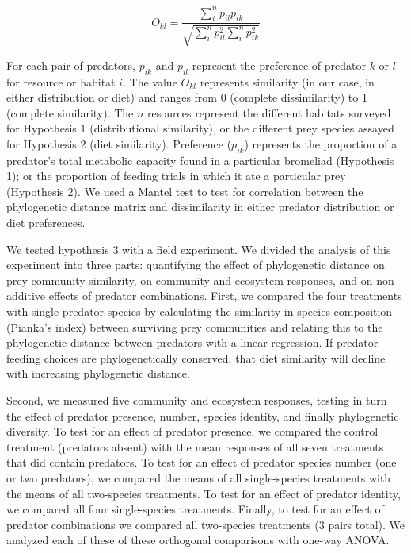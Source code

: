 \documentclass[11pt]{article}
\begin{document}
\begin{equation}
{ O_{kl}=\dfrac{\sum_i^n{p_{il} p_{ik}}}{\sqrt{\sum_i^n{p_{il}^2} \sum_i^n{p_{ik}^2}}} }
\end{equation}

For each pair of predators, \(p_{ik}\) and \(p_{il}\) represent the
preference of predator \(k\) or \(l\) for resource or habitat \(i\). The
value \(O_{kl}\) represents similarity (in our case, in either
distribution or diet) and ranges from 0 (complete dissimilarity) to 1
(complete similarity). The \(n\) resources represent the different
habitats surveyed for Hypothesis 1 (distributional similarity), or the
different prey species assayed for Hypothesis 2 (diet similarity).
Preference (\(p_{ik}\)) represents the proportion of a predator's total
metabolic capacity found in a particular bromeliad (Hypothesis 1); or
the proportion of feeding trials in which it ate a particular prey
(Hypothesis 2). We used a Mantel test to test for correlation between the phylogenetic distance matrix
and dissimilarity in either predator distribution or diet preferences.

We tested hypothesis 3 with a field experiment. We divided the analysis of this experiment into three parts: quantifying
the effect of phylogenetic distance on prey community similarity, on
community and ecosystem responses, and on non-additive effects of
predator combinations. First, we compared the four treatments with
single predator species by calculating the similarity in species
composition (Pianka's index) between surviving prey communities and
relating this to the phylogenetic distance between predators with a
linear regression. If predator feeding choices are phylogenetically
conserved, that diet similarity will decline with increasing
phylogenetic distance.

Second, we measured five community and ecosystem responses, testing in
turn the effect of predator presence, number, species identity, and
finally phylogenetic diversity. To test for an effect of predator
presence, we compared the control treatment (predators absent) with the
mean responses of all seven treatments that did contain predators. To
test for an effect of predator species number (one or two predators), we
compared the means of all single-species treatments with the means of
all two-species treatments. To test for an effect of predator identity,
we compared all four single-species treatments. Finally, to test for an
effect of predator combinations we compared all two-species treatments
(3 pairs total). We analyzed each of these of these orthogonal
comparisons with one-way ANOVA.
\end{document}
